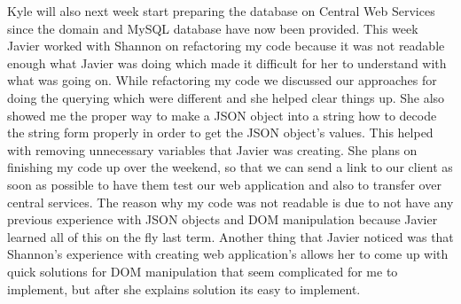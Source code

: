 \documentclass[letterpaper,10pt,serif,draftclsnofoot,onecolumn,compsoc,titlepage]{IEEEtran}
\begin{document}
 Kyle will also next week start preparing the database on Central Web Services since the domain and MySQL
 database have now been provided.
 This week Javier worked with Shannon on refactoring my code because it was not readable enough what Javier was
 doing which made it difficult for her to understand with what was going on. While refactoring my code we
 discussed our approaches for doing the querying which were different and she helped clear things up.
 She also showed me the proper way to make a JSON object into a string how to decode the string form
 properly in order to get the JSON object's values. This helped with removing unnecessary variables that Javier
 was creating. She plans on finishing my code up over the weekend, so that we can send a link to our client
 as soon as possible to have them test our web application and also to transfer over central services. The reason
 why my code was not readable is due to not have any previous experience with JSON objects and DOM manipulation
 because Javier learned all of this on the fly last term. Another thing that Javier noticed was that Shannon's 
 experience with creating web application's allows her to come up with quick solutions for DOM manipulation that
 seem complicated for me to implement, but after she explains solution its easy to implement.
\end{document}

